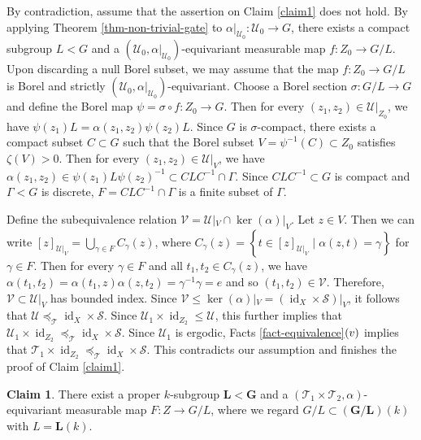 \documentclass[11pt]{amsart}
\numberwithin{equation}{section}
\theoremstyle{plain}
\theoremstyle{definition}
\newtheorem{claim}[thm]{Claim}
\newcommand{\id}{\operatorname{id}}
\begin{document}
By contradiction, assume that the assertion on Claim \ref{claim1} does not hold. By applying Theorem \ref{thm-non-trivial-gate} to $\alpha|_{\mathscr U_0} : \mathscr U_0 \to G$, there exists a compact subgroup $L < G$ and a $(\mathscr U_0, \alpha|_{\mathscr U_0})$-equivariant measurable map $f : Z_0 \to G/L$. Upon discarding a null Borel subset, we may assume that the map $f : Z_0 \to G/L$ is Borel and strictly $(\mathscr U_0, \alpha|_{\mathscr U_0})$-equivariant. Choose a Borel section $\sigma : G/L \to G$ and define the Borel map $\psi = \sigma \circ f : Z_0 \to G$. Then for every $(z_1, z_2) \in \mathscr U|_{Z_0}$, we have $\psi(z_1) L = \alpha(z_1, z_2) \psi(z_2) L$. Since $G$ is $\sigma$-compact, there exists a compact subset $C \subset G$ such that the Borel subset $V = \psi^{-1}(C) \subset Z_0$ satisfies $\zeta(V) > 0$. Then for every $(z_1, z_2) \in \mathscr U|_V$, we have $\alpha(z_1, z_2) \in \psi(z_1) L \psi(z_2)^{-1} \subset C L C^{-1} \cap \Gamma$. Since $C L C^{-1} \subset G$ is compact and $\Gamma < G$ is discrete, $F = C L C^{-1} \cap \Gamma$ is a finite subset of $\Gamma$. 

Define the subequivalence relation $\mathscr V = \mathscr U|_V \cap \ker(\alpha)|_{V}$. Let $z \in V$. Then we can write $[z]_{\mathscr U|_V} = \bigcup_{\gamma \in F} C_\gamma(z)$, where $C_\gamma(z) = \left \{t \in [z]_{\mathscr U|_V} \mid \alpha(z, t) = \gamma\right \}$ for $\gamma \in F$. Then for every $\gamma \in F$ and all $t_1, t_2 \in C_\gamma(z)$, we have $\alpha(t_1, t_2) = \alpha(t_1, z) \alpha(z, t_2) = \gamma^{-1} \gamma = e$ and so $(t_1, t_2) \in \mathscr V$. Therefore, $\mathscr V \subset \mathscr U|_V$ has bounded index. Since $\mathscr V \leq \ker(\alpha)|_V = (\id_X \times \mathscr S)|_V$, it follows that $\mathscr U \preceq_{\mathscr T} \id_X \times \mathscr S$. Since $\mathscr U_1 \times \id_{Z_2} \leq \mathscr U$, this further implies that $\mathscr U_1 \times \id_{Z_2} \preceq_{\mathscr T} \id_X \times \mathscr S$. Since $\mathscr U_1$ is ergodic, Facts \ref{fact-equivalence}$(\rm v)$ implies that $\mathscr T_1 \times \id_{Z_2} \preceq_{\mathscr T} \id_X \times \mathscr S$. This contradicts our assumption and finishes the proof of Claim \ref{claim1}.


\begin{claim}\label{claim2}
There exist a proper $k$-subgroup $\mathbf L < \mathbf G$ and a $(\mathscr T_1 \times \mathscr T_2, \alpha)$-equivariant measurable map $F : Z \to G/L$, where we regard $G/L \subset (\mathbf G/\mathbf L)(k)$ with $L = \mathbf L(k)$.
\end{claim}
\end{document}
